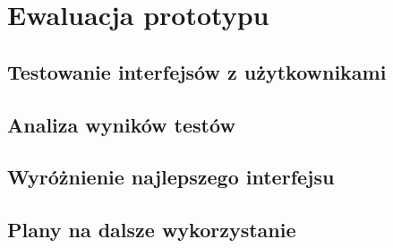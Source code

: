 \chapter{Ewaluacja prototypu}
\section{Testowanie interfejsów z użytkownikami}
\section{Analiza wyników testów}
\section{Wyróżnienie najlepszego interfejsu}
\section{Plany na dalsze wykorzystanie}